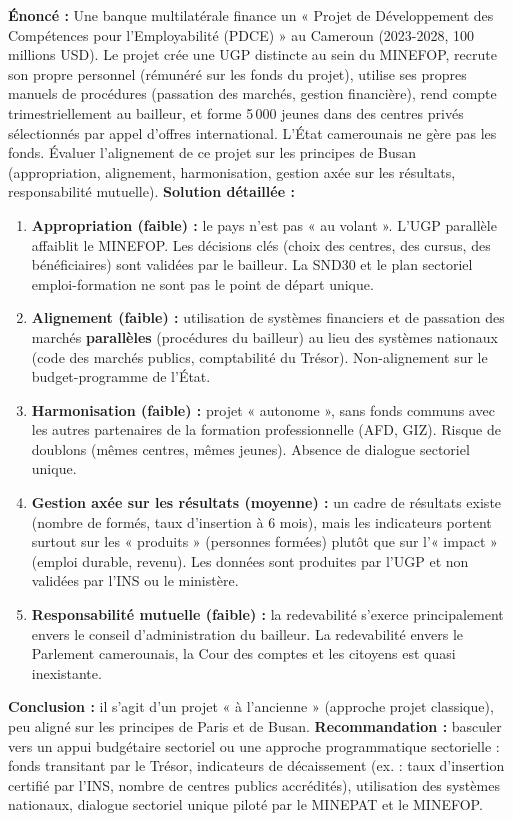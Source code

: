 \documentclass[11pt]{article}
\begin{document}
\begin{exoresolu}
\textbf{Énoncé :} Une banque multilatérale finance un « Projet de Développement des Compétences pour l'Employabilité (PDCE) » au Cameroun (2023-2028, 100 millions USD). Le projet crée une UGP distincte au sein du MINEFOP, recrute son propre personnel (rémunéré sur les fonds du projet), utilise ses propres manuels de procédures (passation des marchés, gestion financière), rend compte trimestriellement au bailleur, et forme 5\,000 jeunes dans des centres privés sélectionnés par appel d'offres international. L'État camerounais ne gère pas les fonds. Évaluer l'alignement de ce projet sur les principes de Busan (appropriation, alignement, harmonisation, gestion axée sur les résultats, responsabilité mutuelle).
\tcblower
\textbf{Solution détaillée :}
\begin{enumerate}
    \item \textbf{Appropriation (faible) :} le pays n'est pas « au volant ». L'UGP parallèle affaiblit le MINEFOP. Les décisions clés (choix des centres, des cursus, des bénéficiaires) sont validées par le bailleur. La SND30 et le plan sectoriel emploi-formation ne sont pas le point de départ unique.
    \item \textbf{Alignement (faible) :} utilisation de systèmes financiers et de passation des marchés \textbf{parallèles} (procédures du bailleur) au lieu des systèmes nationaux (code des marchés publics, comptabilité du Trésor). Non-alignement sur le budget-programme de l'État.
    \item \textbf{Harmonisation (faible) :} projet « autonome », sans fonds communs avec les autres partenaires de la formation professionnelle (AFD, GIZ). Risque de doublons (mêmes centres, mêmes jeunes). Absence de dialogue sectoriel unique.
    \item \textbf{Gestion axée sur les résultats (moyenne) :} un cadre de résultats existe (nombre de formés, taux d'insertion à 6 mois), mais les indicateurs portent surtout sur les « produits » (personnes formées) plutôt que sur l'« impact » (emploi durable, revenu). Les données sont produites par l'UGP et non validées par l'INS ou le ministère.
    \item \textbf{Responsabilité mutuelle (faible) :} la redevabilité s'exerce principalement envers le conseil d'administration du bailleur. La redevabilité envers le Parlement camerounais, la Cour des comptes et les citoyens est quasi inexistante.
\end{enumerate}
\textbf{Conclusion :} il s'agit d'un projet « à l'ancienne » (approche projet classique), peu aligné sur les principes de Paris et de Busan. \textbf{Recommandation :} basculer vers un appui budgétaire sectoriel ou une approche programmatique sectorielle : fonds transitant par le Trésor, indicateurs de décaissement (ex. : taux d'insertion certifié par l'INS, nombre de centres publics accrédités), utilisation des systèmes nationaux, dialogue sectoriel unique piloté par le MINEPAT et le MINEFOP.
\end{exoresolu}
\end{document}
